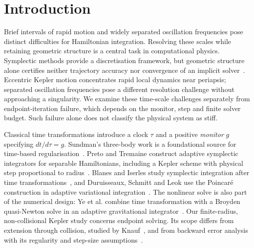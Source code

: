 \documentclass[final,3p,times]{elsarticle}
\begin{document}

\section{Introduction}
\label{sec:introduction}
Brief intervals of rapid motion and widely separated oscillation
frequencies pose distinct difficulties for Hamiltonian integration.
Resolving these scales while retaining geometric structure is a central
task in computational physics. Symplectic methods provide a discretisation
framework, but geometric structure alone certifies neither trajectory
accuracy nor convergence of an implicit solver~\cite{Hairer2006}.
Eccentric Kepler motion concentrates rapid local dynamics near periapsis;
separated oscillation frequencies pose a different resolution challenge
without approaching a singularity. We examine these time-scale challenges
separately from endpoint-iteration failure, which depends on the monitor,
step and finite solver budget. Such failure alone does not classify the
physical system as stiff.

Classical time transformations introduce a clock $\tau$ and a positive
\emph{monitor} $g$ specifying $dt/d\tau=g$. Sundman's three-body work is a
foundational source for time-based regularisation~\cite{Sundman1913}.
Preto and Tremaine construct adaptive symplectic integrators for separable
Hamiltonians, including a Kepler scheme with physical step proportional to
radius~\cite{Preto1999}. Blanes and Iserles study symplectic integration
after time transformations~\cite{Blanes2012}, and Duruisseaux, Schmitt and
Leok use the Poincar\'e construction in adaptive variational
integration~\cite{Duruisseaux2021}. The nonlinear solve is also part of
the numerical design: Ye et al. combine time transformation with a Broyden
quasi-Newton solve in an adaptive gravitational
integrator~\cite{Ye2025}. Our finite-radius, non-collisional Kepler study
concerns endpoint solving. Its scope differs from extension through
collision, studied by Knauf~\cite{Knauf2025}, and from backward error
analysis with its regularity and step-size assumptions~\cite{Reich1999}.
\end{document}
